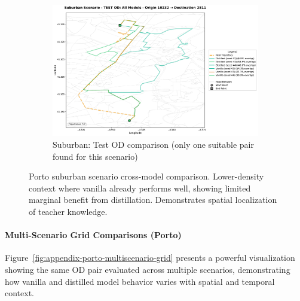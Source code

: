 \begin{figure}[H]
    \centering
    \begin{subfigure}{0.8\linewidth}
        \centering
        \includegraphics[width=\linewidth]{assets/plots/eval/porto/scenario_cross_model/test/suburban/test_od_comparison_1_origin10232_dest2811.pdf}
        \caption{Suburban: Test OD comparison (only one suitable pair found for this scenario)}
    \end{subfigure}
    \caption{Porto suburban scenario cross-model comparison. Lower-density context where vanilla already performs well, showing limited marginal benefit from distillation. Demonstrates spatial localization of teacher knowledge.}
    \label{fig:appendix-porto-scenario-suburban}
\end{figure}

\paragraph{Multi-Scenario Grid Comparisons (Porto)}

Figure~\ref{fig:appendix-porto-multiscenario-grid} presents a powerful visualization showing the same OD pair evaluated across multiple scenarios, demonstrating how vanilla and distilled model behavior varies with spatial and temporal context.

